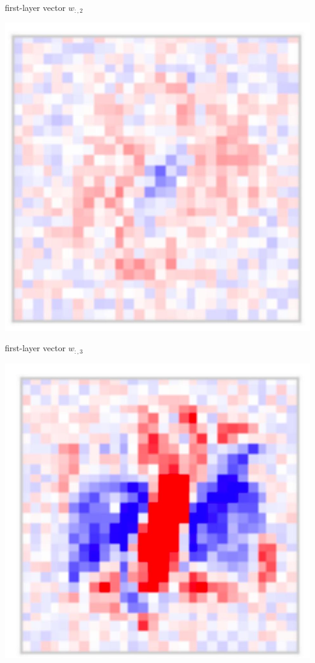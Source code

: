\documentclass[10pt]{article}
\begin{document}
first-layer vector $w_{:, 2}$

\begin{center}
\includegraphics[max width=\textwidth]{2024_01_08_959e2db67a31f073f6d2g-15(2)}
\end{center}

first-layer vector $w_{:, 3}$

\begin{center}
\includegraphics[max width=\textwidth]{2024_01_08_959e2db67a31f073f6d2g-15(1)}
\end{center}
\end{document}
